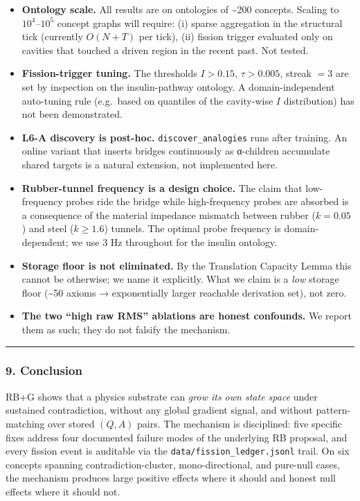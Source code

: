 \documentclass[
  11pt,
  a4paper,
]{article}
\providecommand{\tightlist}{%
  \setlength{\itemsep}{0pt}\setlength{\parskip}{0pt}}
\begin{document}
\begin{itemize}
\tightlist
\item
  \textbf{Ontology scale.} All results are on ontologies of
  \textasciitilde200 concepts. Scaling to \(10^4\)--\(10^5\) concept
  graphs will require: (i) sparse aggregation in the structural tick
  (currently \(O(N + T)\) per tick), (ii) fission trigger evaluated only
  on cavities that touched a driven region in the recent past. Not
  tested.
\item
  \textbf{Fission-trigger tuning.} The thresholds \(I > 0.15\),
  \(\tau > 0.005\), streak \(= 3\) are set by inspection on the
  insulin-pathway ontology. A domain-independent auto-tuning rule
  (e.g.~based on quantiles of the cavity-wise \(I\) distribution) has
  not been demonstrated.
\item
  \textbf{L6-A discovery is post-hoc.} \texttt{discover\_analogies} runs
  after training. An online variant that inserts bridges continuously as
  α-children accumulate shared targets is a natural extension, not
  implemented here.
\item
  \textbf{Rubber-tunnel frequency is a design choice.} The claim that
  low-frequency probes ride the bridge while high-frequency probes are
  absorbed is a consequence of the material impedance mismatch between
  rubber (\(k=0.05\)) and steel (\(k \geq 1.6\)) tunnels. The optimal
  probe frequency is domain-dependent; we use 3 Hz throughout for the
  insulin ontology.
\item
  \textbf{Storage floor is not eliminated.} By the Translation Capacity
  Lemma this cannot be otherwise; we name it explicitly. What we claim
  is a \emph{low} storage floor (\textasciitilde50 axioms →
  exponentially larger reachable derivation set), not zero.
\item
  \textbf{The two ``high raw RMS'' ablations are honest confounds.} We
  report them as such; they do not falsify the mechanism.
\end{itemize}

\begin{center}\rule{0.5\linewidth}{0.5pt}\end{center}

\subsubsection{9. Conclusion}\label{conclusion-1}

RB+G shows that a physics substrate can \emph{grow its own state space}
under sustained contradiction, without any global gradient signal, and
without pattern-matching over stored \((Q, A)\) pairs. The mechanism is
disciplined: five specific fixes address four documented failure modes
of the underlying RB proposal, and every fission event is auditable via
the \texttt{data/fission\_ledger.jsonl} trail. On six concepts spanning
contradiction-cluster, mono-directional, and pure-null cases, the
mechanism produces large positive effects where it should and honest
null effects where it should not.
\end{document}
